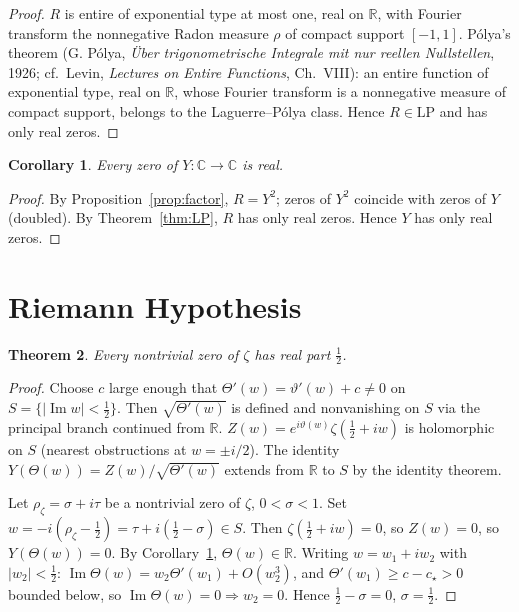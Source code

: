 \documentclass[11pt,a4paper]{article}
\theoremstyle{plain}
\newtheorem{theorem}{Theorem}
\newtheorem{corollary}[theorem]{Corollary}
\theoremstyle{definition}
\theoremstyle{remark}
\newcommand{\R}{\mathbb{R}}
\newcommand{\C}{\mathbb{C}}
\DeclareMathOperator{\Imag}{Im}
\begin{document}
\begin{proof}
$R$ is entire of exponential type at most one, real on $\R$, with Fourier transform the nonnegative Radon measure $\rho$ of compact support $[-1,1]$. P\'olya's theorem (G. P\'olya, \emph{\"Uber trigonometrische Integrale mit nur reellen Nullstellen}, 1926; cf.\ Levin, \emph{Lectures on Entire Functions}, Ch.~VIII): an entire function of exponential type, real on $\R$, whose Fourier transform is a nonnegative measure of compact support, belongs to the Laguerre--P\'olya class. Hence $R\in\mathrm{LP}$ and has only real zeros.
\end{proof}

\begin{corollary}\label{cor:Yreal}
Every zero of $Y:\C\to\C$ is real.
\end{corollary}

\begin{proof}
By Proposition~\ref{prop:factor}, $R=Y^2$; zeros of $Y^2$ coincide with zeros of $Y$ (doubled). By Theorem~\ref{thm:LP}, $R$ has only real zeros. Hence $Y$ has only real zeros.
\end{proof}

\section{Riemann Hypothesis}

\begin{theorem}\label{thm:RH}
Every nontrivial zero of $\zeta$ has real part $\tfrac12$.
\end{theorem}

\begin{proof}
Choose $c$ large enough that $\Theta'(w)=\vartheta'(w)+c\ne 0$ on $S=\{|\Imag w|<\tfrac12\}$. Then $\sqrt{\Theta'(w)}$ is defined and nonvanishing on $S$ via the principal branch continued from $\R$. $Z(w)=e^{i\vartheta(w)}\zeta(\tfrac12+iw)$ is holomorphic on $S$ (nearest obstructions at $w=\pm i/2$). The identity $Y(\Theta(w))=Z(w)/\sqrt{\Theta'(w)}$ extends from $\R$ to $S$ by the identity theorem.

Let $\rho_\zeta=\sigma+i\tau$ be a nontrivial zero of $\zeta$, $0<\sigma<1$. Set $w=-i(\rho_\zeta-\tfrac12)=\tau+i(\tfrac12-\sigma)\in S$. Then $\zeta(\tfrac12+iw)=0$, so $Z(w)=0$, so $Y(\Theta(w))=0$. By Corollary~\ref{cor:Yreal}, $\Theta(w)\in\R$. Writing $w=w_1+iw_2$ with $|w_2|<\tfrac12$: $\Imag\Theta(w)=w_2\Theta'(w_1)+O(w_2^3)$, and $\Theta'(w_1)\ge c-c_\star>0$ bounded below, so $\Imag\Theta(w)=0\Rightarrow w_2=0$. Hence $\tfrac12-\sigma=0$, $\sigma=\tfrac12$.
\end{proof}
\end{document}
